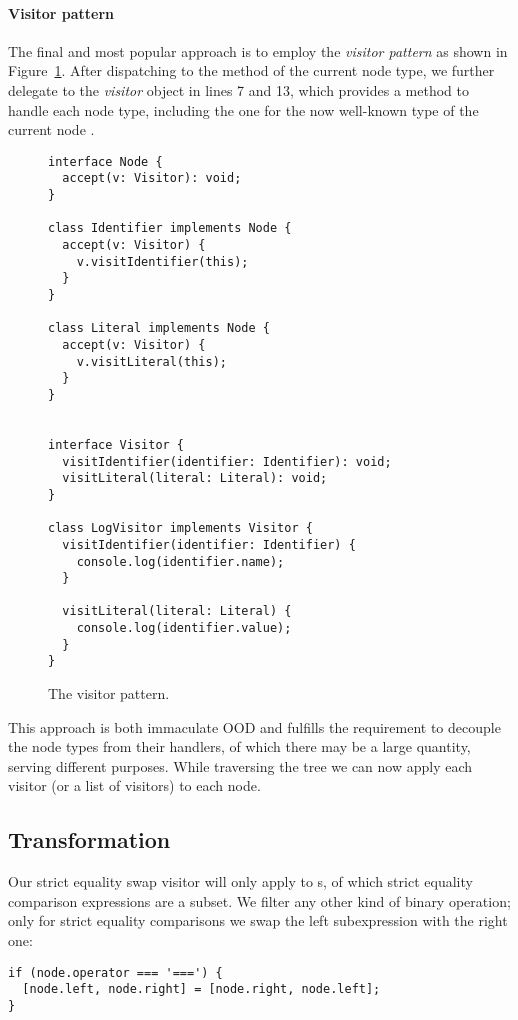 \paragraph{Visitor pattern}
The final and most popular approach is
to employ the \textit{visitor pattern}
as shown in Figure~\ref{fig:TreeNodeVisitorPattern}.
\autocite{DesignPatterns}
After dispatching to the  method
of the current node type,
we further delegate to the \textit{visitor} object
in lines 7 and 13,
which provides a method to handle each node type,
including the one for the now well-known type
of the current node .

\begin{figure}
  \begin{verbatim}
interface Node {
  accept(v: Visitor): void;
}

class Identifier implements Node {
  accept(v: Visitor) {
    v.visitIdentifier(this);
  }
}

class Literal implements Node {
  accept(v: Visitor) {
    v.visitLiteral(this);
  }
}


interface Visitor {
  visitIdentifier(identifier: Identifier): void;
  visitLiteral(literal: Literal): void;
}

class LogVisitor implements Visitor {
  visitIdentifier(identifier: Identifier) {
    console.log(identifier.name);
  }

  visitLiteral(literal: Literal) {
    console.log(identifier.value);
  }
}
  \end{verbatim}
  \caption{
    The visitor pattern.
  }\label{fig:TreeNodeVisitorPattern}
\end{figure}

This approach is both immaculate OOD and
fulfills the requirement to
decouple the node types from their handlers,
of which there may be a large quantity,
serving different purposes.
While traversing the tree we can now apply each visitor
(or a list of visitors) to each node.

\subsection{Transformation}
Our strict equality swap visitor will only apply to s,
of which strict equality comparison expressions are a subset.
We filter any other kind of binary operation;
only for strict equality comparisons we swap the
left subexpression with the right one:
\begin{verbatim}
if (node.operator === '===') {
  [node.left, node.right] = [node.right, node.left];
}
\end{verbatim}

